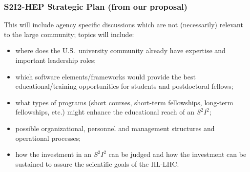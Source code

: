\begin{frame}
\frametitle{S2I2-HEP Strategic Plan (from our proposal)} 

This will include agency specific discussions which are not (necessarily) 
relevant to the large community; topics will include:
 \begin{itemize}
   \item
     where does the U.S.\ university community already have
     expertise and important leadership roles;
   \item
     which software elements/frameworks would provide
     the best educational/training opportunities
     for students and postdoctoral fellows;
   \item
     what  types of programs (short courses, short-term
     fellowships, long-term fellowships, etc.)
     might enhance the educational
     reach of an $ S^2 I^2 $;
   \item
     possible organizational, personnel and management
     structures and operational processes;
    \item
     how the investment in an $ S^2 I^2 $ can be judged
     and how the investment can be sustained
     to assure the scientific goals of the HL-LHC.
 \end{itemize}

\end{frame}



